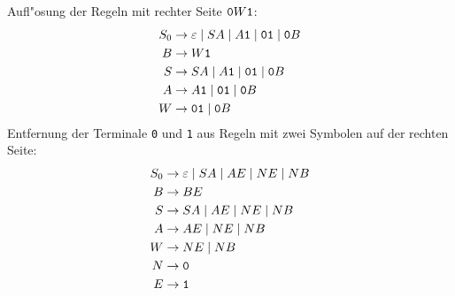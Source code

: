 \begin{loesung}
Aufl"osung der Regeln mit rechter Seite ${\tt 0}W{\tt 1}$:
\begin{align*}
S_0&\to \varepsilon\;|\;SA\;|\;A{\tt 1}\;|\;{\tt 01}\;|\;{\tt 0}B\\
B  &\to W{\tt 1}\\
S  &\to SA\;|\;A{\tt 1}\;|\;{\tt 01}\;|\;{\tt 0}B\\
A  &\to A{\tt 1}\;|\;{\tt 01}\;|\;{\tt 0}B\\
W  &\to {\tt 01}\;|\; {\tt 0}B
\end{align*}
Entfernung der Terminale {\tt 0} und {\tt 1} aus Regeln mit zwei Symbolen
auf der rechten Seite:
\begin{align*}
S_0&\to \varepsilon\;|\;SA\;|\;AE\;|\;NE\;|\;NB\\
B  &\to BE\\
S  &\to SA\;|\;AE\;|\;NE\;|\;NB\\
A  &\to AE\;|\;NE\;|\;NB\\
W  &\to NE\;|\; NB\\
N  &\to {\tt 0}\\
E  &\to {\tt 1}
\end{align*}
\end{loesung}
